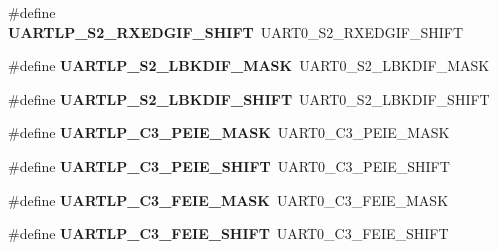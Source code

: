 \begin{DoxyCompactItemize}
\item 
\hypertarget{group___backward___compatibility___symbols_gad414e0468b66c66ff2e90d1f8476c5fe}{}\#define {\bfseries U\+A\+R\+T\+L\+P\+\_\+\+S2\+\_\+\+R\+X\+E\+D\+G\+I\+F\+\_\+\+S\+H\+I\+F\+T}~U\+A\+R\+T0\+\_\+\+S2\+\_\+\+R\+X\+E\+D\+G\+I\+F\+\_\+\+S\+H\+I\+F\+T\label{group___backward___compatibility___symbols_gad414e0468b66c66ff2e90d1f8476c5fe}

\item 
\hypertarget{group___backward___compatibility___symbols_gaa43c6661dd27a409a7e7e17506c6bfde}{}\#define {\bfseries U\+A\+R\+T\+L\+P\+\_\+\+S2\+\_\+\+L\+B\+K\+D\+I\+F\+\_\+\+M\+A\+S\+K}~U\+A\+R\+T0\+\_\+\+S2\+\_\+\+L\+B\+K\+D\+I\+F\+\_\+\+M\+A\+S\+K\label{group___backward___compatibility___symbols_gaa43c6661dd27a409a7e7e17506c6bfde}

\item 
\hypertarget{group___backward___compatibility___symbols_ga82b6d0e62d2a3a3eeed35d124fb2b31c}{}\#define {\bfseries U\+A\+R\+T\+L\+P\+\_\+\+S2\+\_\+\+L\+B\+K\+D\+I\+F\+\_\+\+S\+H\+I\+F\+T}~U\+A\+R\+T0\+\_\+\+S2\+\_\+\+L\+B\+K\+D\+I\+F\+\_\+\+S\+H\+I\+F\+T\label{group___backward___compatibility___symbols_ga82b6d0e62d2a3a3eeed35d124fb2b31c}

\item 
\hypertarget{group___backward___compatibility___symbols_ga4cc8bfb380818563bdfa2f98fbde7710}{}\#define {\bfseries U\+A\+R\+T\+L\+P\+\_\+\+C3\+\_\+\+P\+E\+I\+E\+\_\+\+M\+A\+S\+K}~U\+A\+R\+T0\+\_\+\+C3\+\_\+\+P\+E\+I\+E\+\_\+\+M\+A\+S\+K\label{group___backward___compatibility___symbols_ga4cc8bfb380818563bdfa2f98fbde7710}

\item 
\hypertarget{group___backward___compatibility___symbols_gacaf37722e62340c548104406df0bcc64}{}\#define {\bfseries U\+A\+R\+T\+L\+P\+\_\+\+C3\+\_\+\+P\+E\+I\+E\+\_\+\+S\+H\+I\+F\+T}~U\+A\+R\+T0\+\_\+\+C3\+\_\+\+P\+E\+I\+E\+\_\+\+S\+H\+I\+F\+T\label{group___backward___compatibility___symbols_gacaf37722e62340c548104406df0bcc64}

\item 
\hypertarget{group___backward___compatibility___symbols_ga06e90c952858ab6b2a6e8fec451fed4a}{}\#define {\bfseries U\+A\+R\+T\+L\+P\+\_\+\+C3\+\_\+\+F\+E\+I\+E\+\_\+\+M\+A\+S\+K}~U\+A\+R\+T0\+\_\+\+C3\+\_\+\+F\+E\+I\+E\+\_\+\+M\+A\+S\+K\label{group___backward___compatibility___symbols_ga06e90c952858ab6b2a6e8fec451fed4a}

\item 
\hypertarget{group___backward___compatibility___symbols_ga47332e2095915eede18d8b2e44bc08d3}{}\#define {\bfseries U\+A\+R\+T\+L\+P\+\_\+\+C3\+\_\+\+F\+E\+I\+E\+\_\+\+S\+H\+I\+F\+T}~U\+A\+R\+T0\+\_\+\+C3\+\_\+\+F\+E\+I\+E\+\_\+\+S\+H\+I\+F\+T\label{group___backward___compatibility___symbols_ga47332e2095915eede18d8b2e44bc08d3}


\end{DoxyCompactItemize}
